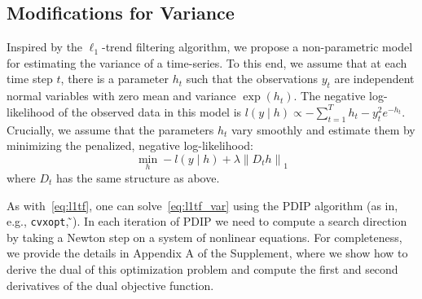 \documentclass[letterpaper]{article} %
\newcommand{\citealp}[1]
{\citeauthor{#1} ̃\citeyear{#1}}
\newcommand{\autoref}{\Cref}
\newcommand{\given}{\;\vert\;}
\newcommand{\norm}[1]{\left\lVert #1 \right\rVert}
\begin{document}

\subsection{Modifications for Variance}
\label{sec:l1tf_var}


Inspired by the $\ell_1$-trend filtering algorithm, we propose a
non-parametric model for estimating the variance of a time-series. To
this end, we assume that at each time step $t$, there is a parameter
$h_t$ such that the observations $y_t$
are independent normal variables with zero mean and variance
$\exp(h_t)$. The negative log-likelihood of the observed data in this
model is $l(y\given h) \propto -\sum_{t=1}^T h_t - y_t^2e^{-h_t}$. Crucially,
we assume that the parameters $h_t$ vary smoothly and estimate them by
minimizing the penalized, negative
log-likelihood:  
\begin{equation}
\min_h -l(y\given h)+\lambda \norm{ D_th }_1
\label{eq:l1tf_var}
\end{equation}
where $D_t$ has the same structure as above.

As with~\eqref{eq:l1tf}, one can solve~\eqref{eq:l1tf_var} using the
PDIP algorithm (as in, e.g.,
\texttt{cvxopt}, \citealp{andersen_cvxopt:_2013}). In each iteration of
PDIP we need to compute a search direction by taking a Newton
step on a system of nonlinear equations. For completeness, we
provide the details in Appendix A of the Supplement, where we show how to
derive the dual of this optimization problem and compute the first and
second derivatives of the dual objective function.  
\end{document}
